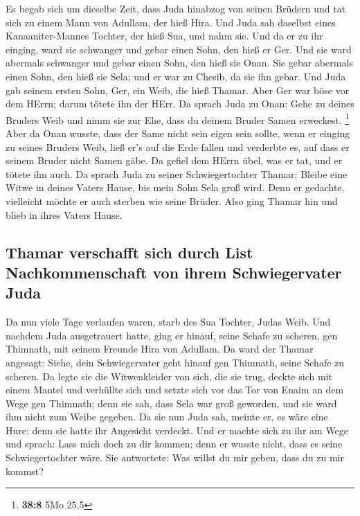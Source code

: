  Es begab sich um dieselbe Zeit, dass Juda hinabzog von
seinen Brüdern und tat sich zu einem Mann von Adullam, der hieß Hira.
 Und Juda sah daselbst eines Kanaaniter-Mannes Tochter,
der hieß Sua, und nahm sie. Und da er zu ihr einging, 
ward sie schwanger und gebar einen Sohn, den hieß er Ger. 
Und sie ward abermals schwanger und gebar einen Sohn, den hieß sie Onan.
 Sie gebar abermals einen Sohn, den hieß sie Sela; und er
war zu Chesib, da sie ihn gebar.  Und Juda gab seinem
ersten Sohn, Ger, ein Weib, die hieß Thamar.  Aber Ger war
böse vor dem HErrn; darum tötete ihn der HErr.  Da sprach
Juda zu Onan: Gehe zu deines Bruders Weib und nimm sie zur Ehe, dass du
deinem Bruder Samen erweckest. \footnote{\textbf{38:8} 5Mo 25,5}
 Aber da Onan wusste, dass der Same nicht sein eigen sein
sollte, wenn er einging zu seines Bruders Weib, ließ er's auf die Erde
fallen und verderbte es, auf dass er seinem Bruder nicht Samen gäbe.
 Da gefiel dem HErrn übel, was er tat, und er tötete ihn
auch.  Da sprach Juda zu seiner Schwiegertochter Thamar:
Bleibe eine Witwe in deines Vaters Hause, bis mein Sohn Sela groß wird.
Denn er gedachte, vielleicht möchte er auch sterben wie seine Brüder.
Also ging Thamar hin und blieb in ihres Vaters Hause.

\hypertarget{thamar-verschafft-sich-durch-list-nachkommenschaft-von-ihrem-schwiegervater-juda}{%
\subsection{Thamar verschafft sich durch List Nachkommenschaft von ihrem
Schwiegervater
Juda}\label{thamar-verschafft-sich-durch-list-nachkommenschaft-von-ihrem-schwiegervater-juda}}

 Da nun viele Tage verlaufen waren, starb des Sua
Tochter, Judas Weib. Und nachdem Juda ausgetrauert hatte, ging er
hinauf, seine Schafe zu scheren, gen Thimnath, mit seinem Freunde Hira
von Adullam.  Da ward der Thamar angesagt: Siehe, dein
Schwiegervater geht hinauf gen Thimnath, seine Schafe zu scheren.
 Da legte sie die Witwenkleider von sich, die sie trug,
deckte sich mit einem Mantel und verhüllte sich und setzte sich vor das
Tor von Enaim an dem Wege gen Thimnath; denn sie sah, dass Sela war groß
geworden, und sie ward ihm nicht zum Weibe gegeben.  Da
sie nun Juda sah, meinte er, es wäre eine Hure; denn sie hatte ihr
Angesicht verdeckt.  Und er machte sich zu ihr am Wege
und sprach: Lass mich doch zu dir kommen; denn er wusste nicht, dass es
seine Schwiegertochter wäre. Sie antwortete: Was willst du mir geben,
dass du zu mir kommst?


